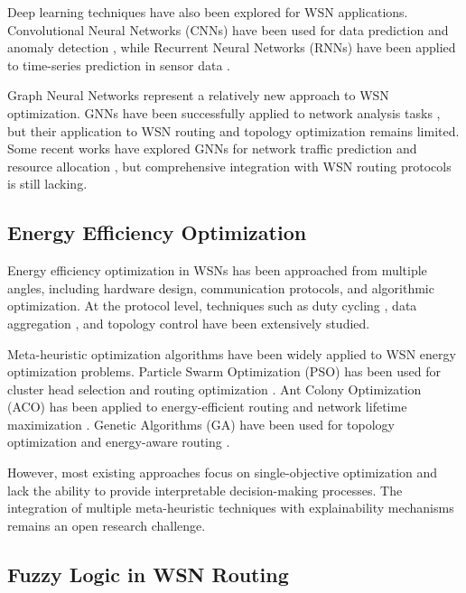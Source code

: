 \documentclass[conference]{IEEEtran}
\begin{document}
Deep learning techniques have also been explored for WSN applications. Convolutional Neural Networks (CNNs) have been used for data prediction and anomaly detection \cite{zhang2018deep}, while Recurrent Neural Networks (RNNs) have been applied to time-series prediction in sensor data \cite{li2018lstm}.

Graph Neural Networks represent a relatively new approach to WSN optimization. GNNs have been successfully applied to network analysis tasks \cite{wu2020comprehensive}, but their application to WSN routing and topology optimization remains limited. Some recent works have explored GNNs for network traffic prediction \cite{jiang2021graph} and resource allocation \cite{shen2021graph}, but comprehensive integration with WSN routing protocols is still lacking.

\subsection{Energy Efficiency Optimization}

Energy efficiency optimization in WSNs has been approached from multiple angles, including hardware design, communication protocols, and algorithmic optimization. At the protocol level, techniques such as duty cycling \cite{anastasi2009energy}, data aggregation \cite{rajagopalan2006data}, and topology control \cite{santi2005topology} have been extensively studied.

Meta-heuristic optimization algorithms have been widely applied to WSN energy optimization problems. Particle Swarm Optimization (PSO) has been used for cluster head selection \cite{latiff2007energy} and routing optimization \cite{singh2017energy}. Ant Colony Optimization (ACO) has been applied to energy-efficient routing \cite{camilo2006energy} and network lifetime maximization \cite{okdem2008routing}. Genetic Algorithms (GA) have been used for topology optimization \cite{hussain2007genetic} and energy-aware routing \cite{barani2008energy}.

However, most existing approaches focus on single-objective optimization and lack the ability to provide interpretable decision-making processes. The integration of multiple meta-heuristic techniques with explainability mechanisms remains an open research challenge.

\subsection{Fuzzy Logic in WSN Routing}
\end{document}
